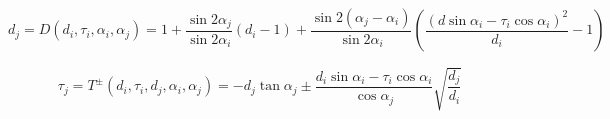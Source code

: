 \documentclass[a4paper]{article}
\begin{document}
\begin{equation} 
 \label{GrindEQ__24_}
{d_j} =D\left(d_{i} ,\tau _{i} ,\alpha _{i} ,\alpha _{j}\right)= 1 + \frac{{\sin 2{\alpha _j}}}{{\sin 2{\alpha _i}}}\left( {{d_i} - 1} \right) + \frac{{\sin 2\left( {{\alpha _j} - {\alpha _i}} \right)}}{{\sin 2{\alpha _i}}}\left( {\frac{{{{\left( {d\sin {\alpha _i} - {\tau _i}\cos {\alpha _i}} \right)}^2}}}{{{d_i}}} - 1} \right) 
\end{equation}

\begin{equation} 
 \label{GrindEQ__25_} {\tau _j} = T^{\pm }\left(d_{i} ,\tau _{i} ,d_{j},\alpha_i,\alpha_j \right)= - {d_j}\tan {\alpha _j} \pm \frac{{{d_i}\sin {\alpha _i} - {\tau _i}\cos {\alpha _i}}}{{\cos {\alpha _j}}}\sqrt {\frac{{{d_j}}}{{{d_i}}}}
\end{equation}


%
 
\end{document}
